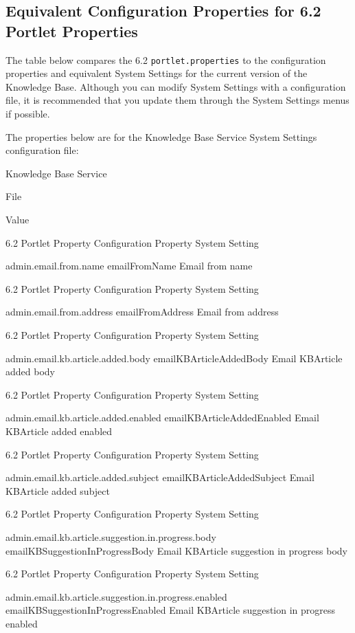 \subsection{Equivalent Configuration Properties for 6.2 Portlet
Properties}\label{equivalent-configuration-properties-for-6.2-portlet-properties}

The table below compares the 6.2 \texttt{portlet.properties} to the
configuration properties and equivalent System Settings for the current
version of the Knowledge Base. Although you can modify System Settings
with a configuration file, it is recommended that you update them
through the System Settings menus if possible.

The properties below are for the Knowledge Base Service System Settings
configuration file:

Knowledge Base Service

File

Value

6.2 Portlet Property Configuration Property System Setting

admin.email.from.name emailFromName Email from name

6.2 Portlet Property Configuration Property System Setting

admin.email.from.address emailFromAddress Email from address

6.2 Portlet Property Configuration Property System Setting

admin.email.kb.article.added.body emailKBArticleAddedBody Email
KBArticle added body

6.2 Portlet Property Configuration Property System Setting

admin.email.kb.article.added.enabled emailKBArticleAddedEnabled Email
KBArticle added enabled

6.2 Portlet Property Configuration Property System Setting

admin.email.kb.article.added.subject emailKBArticleAddedSubject Email
KBArticle added subject

6.2 Portlet Property Configuration Property System Setting

admin.email.kb.article.suggestion.in.progress.body
emailKBSuggestionInProgressBody Email KBArticle suggestion in progress
body

6.2 Portlet Property Configuration Property System Setting

admin.email.kb.article.suggestion.in.progress.enabled
emailKBSuggestionInProgressEnabled Email KBArticle suggestion in
progress enabled

